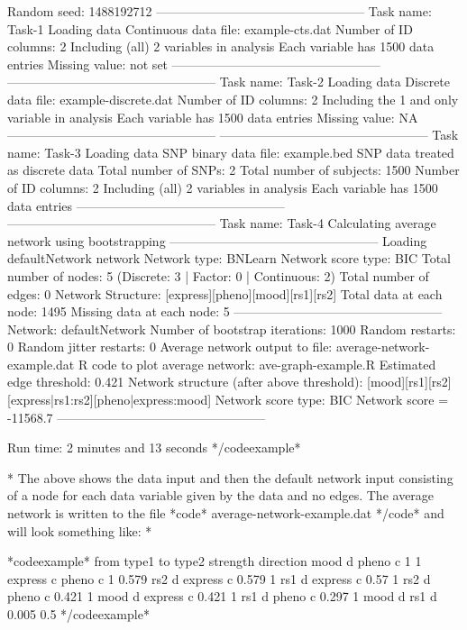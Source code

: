 Random seed: 1488192712 -------------------------------------------------- Task name: Task-1 Loading data Continuous data file: example-cts.dat Number of ID columns: 2 Including (all) 2 variables in analysis Each variable has 1500 data entries Missing value: not set -------------------------------------------------- -------------------------------------------------- Task name: Task-2 Loading data Discrete data file: example-discrete.dat Number of ID columns: 2 Including the 1 and only variable in analysis Each variable has 1500 data entries Missing value: NA -------------------------------------------------- -------------------------------------------------- Task name: Task-3 Loading data SNP binary data file: example.bed SNP data treated as discrete data Total number of SNPs: 2 Total number of subjects: 1500 Number of ID columns: 2 Including (all) 2 variables in analysis Each variable has 1500 data entries -------------------------------------------------- -------------------------------------------------- Task name: Task-4 Calculating average network using bootstrapping -------------------------------------------------- Loading defaultNetwork network Network type: BNLearn Network score type: BIC Total number of nodes: 5 (Discrete: 3 | Factor: 0 | Continuous: 2) Total number of edges: 0 Network Structure: [express][pheno][mood][rs1][rs2] Total data at each node: 1495 Missing data at each node: 5 -------------------------------------------------- Network: defaultNetwork Number of bootstrap iterations: 1000 Random restarts: 0 Random jitter restarts: 0 Average network output to file: average-network-example.dat R code to plot average network: ave-graph-example.R Estimated edge threshold: 0.421 Network structure (after above threshold): [mood][rs1][rs2][express|rs1:rs2][pheno|express:mood] Network score type: BIC Network score = -11568.7 --------------------------------------------------

Run time: 2 minutes and 13 seconds */codeexample*

* The above shows the data input and then the default network input consisting of a node for each data variable given by the data and no edges. The average network is written to the file *code* average-network-example.dat */code* and will look something like: *

*codeexample* from  type1  to  type2  strength  direction mood  d  pheno  c  1  1 express  c  pheno  c  1  0.579 rs2  d  express  c  0.579  1 rs1  d  express  c  0.57  1 rs2  d  pheno  c  0.421  1 mood  d  express  c  0.421  1 rs1  d  pheno  c  0.297  1 mood  d  rs1  d  0.005  0.5 */codeexample*

